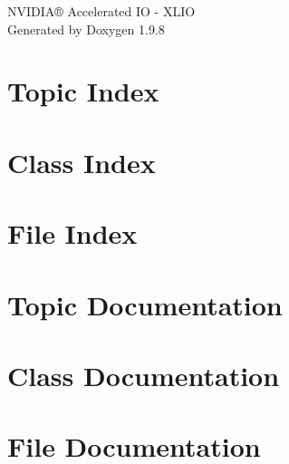 \documentclass[twoside]{book}
\newcommand{\+}{\discretionary{\mbox{\scriptsize$\hookleftarrow$}}{}{}}
\newcommand{\clearemptydoublepage}{%
    \newpage{\pagestyle{empty}\cleardoublepage}%
  }
\begin{document}
  \raggedbottom
    \hypersetup{pageanchor=false,
                bookmarksnumbered=true,
                pdfencoding=unicode
               }
  \begin{titlepage}
  \vspace*{7cm}
  \begin{center}%
  {\Large NVIDIA® Accelerated IO -\/ XLIO}\\
  \vspace*{1cm}
  {\large Generated by Doxygen 1.9.8}\\
  \end{center}
  \end{titlepage}
  \clearemptydoublepage
  \tableofcontents
  \clearemptydoublepage
  \hypersetup{pageanchor=true}

\chapter{Topic Index}

\chapter{Class Index}

\chapter{File Index}

\chapter{Topic Documentation}

\chapter{Class Documentation}





\chapter{File Documentation}

  \backmatter
  \newpage
  \clearemptydoublepage
  \printindex
\end{document}
